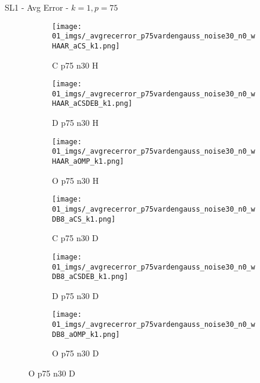\begin{frame}{SL1 - Avg Error - $k=1,p=75$}{}
\begin{figure}
\vspace{5pt}

\begin{subfigure}{0.13\textwidth}
\texttt{[image: 01\_imgs/\_avgrecerror\_p75vardengauss\_noise30\_n0\_wHAAR\_aCS\_k1.png]}
\caption*{\tiny C p75 n30 H}
\end{subfigure}
\begin{subfigure}{0.13\textwidth}
\texttt{[image: 01\_imgs/\_avgrecerror\_p75vardengauss\_noise30\_n0\_wHAAR\_aCSDEB\_k1.png]}
\caption*{\tiny D p75 n30 H}
\end{subfigure}
\begin{subfigure}{0.13\textwidth}
\texttt{[image: 01\_imgs/\_avgrecerror\_p75vardengauss\_noise30\_n0\_wHAAR\_aOMP\_k1.png]}
\caption*{\tiny O p75 n30 H}
\end{subfigure}
\begin{subfigure}{0.13\textwidth}
\texttt{[image: 01\_imgs/\_avgrecerror\_p75vardengauss\_noise30\_n0\_wDB8\_aCS\_k1.png]}
\caption*{\tiny C p75 n30 D}
\end{subfigure}
\begin{subfigure}{0.13\textwidth}
\texttt{[image: 01\_imgs/\_avgrecerror\_p75vardengauss\_noise30\_n0\_wDB8\_aCSDEB\_k1.png]}
\caption*{\tiny D p75 n30 D}
\end{subfigure}
\begin{subfigure}{0.13\textwidth}
\texttt{[image: 01\_imgs/\_avgrecerror\_p75vardengauss\_noise30\_n0\_wDB8\_aOMP\_k1.png]}
\caption*{\tiny O p75 n30 D}
\end{subfigure}
\end{figure}
\end{frame}


